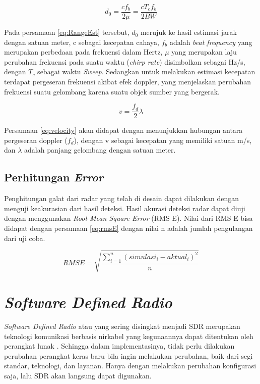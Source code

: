 \begin{equation}
	d_{0} = \frac{c f_{b}}{2 \mu} = \frac{c T_{c} f_{b}}{2 BW}
	\label{eq:RangeEst}
\end{equation}

Pada persamaan \ref{eq:RangeEst} tersebut, $d_{0}$ merujuk ke hasil estimasi jarak dengan satuan meter,  c sebagai kecepatan cahaya, $f_{b}$ adalah \textit{beat frequency} yang merupakan perbedaan pada frekuensi dalam Hertz, $\mu$ yang merupakan laju perubahan frekuensi pada suatu waktu (\textit{chirp rate}) disimbolkan sebagai Hz/s, dengan $T_{c}$ sebagai waktu \textit{Sweep}. Sedangkan untuk melakukan estimasi kecepatan terdapat pergeseran frekuensi akibat efek doppler, yang menjelaskan perubahan frekuensi suatu gelombang karena suatu objek sumber yang bergerak. 

\begin{equation}
	v = \frac{f_{d}}{2}\lambda
	\label{eq:velocity}
\end{equation}

Persamaan \ref{eq:velocity} akan didapat dengan menunjukkan hubungan antara pergeseran doppler ($f_{d}$), dengan v sebagai kecepatan yang memiliki satuan m/s, dan $\lambda$ adalah panjang gelombang dengan satuan meter. 

\subsection{Perhitungan \textit{Error}}
Penghitungan galat dari radar yang telah di desain dapat dilakukan dengan menguji keakurasian dari hasil deteksi. Hasil akurasi deteksi radar dapat diuji dengan menggunakan \textit{Root Mean Square Error} (RMS E). Nilai dari RMS E bisa didapat dengan persamaan \ref{eq:rmsE} dengan nilai n adalah jumlah pengulangan dari uji coba.

\begin{equation}
	RMS E = \sqrt{\frac{\sum_{i = 1}^{n} (simulasi_{i}-aktual_{i})^2}{n}}
	\label{eq:rmsE}
\end{equation}

\section{\textit{Software Defined Radio}}
\textit{Software Defined Radio} atau yang sering disingkat menjadi SDR merupakan teknologi komunikasi berbasis nirkabel yang kegunaannya dapat ditentukan oleh perangkat lunak \cite{Anisah2018}. Sehingga dalam implementasinya, tidak perlu dilakukan perubahan perangkat keras baru bila ingin melakukan perubahan, baik dari segi standar, teknologi, dan layanan. Hanya dengan melakukan perubahan konfigurasi saja, lalu SDR akan langsung dapat digunakan. 

